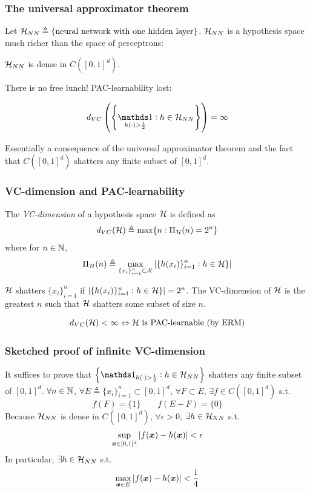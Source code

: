 \documentclass{beamer}
\DeclareMathOperator{\ind}{{\mathds 1}}
\begin{document}
\begin{frame}

\frametitle{The universal approximator theorem}

Let ${\mathcal H}_{NN} \triangleq \{\text{neural network with one hidden layer}\}$.
${\mathcal H}_{NN}$ is a hypothesis space much richer than the space of perceptrons:
\begin{theorem}
${\mathcal H}_{NN}$ is dense in $C ([0, 1]^d)$.
\end{theorem}

There is no free lunch!
PAC-learnability lost:
\begin{corollary}
\[
d_{VC} \left(\left\{\ind_{h(\cdot) > \frac12} : h \in \calh_{NN}\right\}\right) = \infty
\]
\end{corollary}
Essentially a consequence of the universal approximator theorem and the fact that $C ([0, 1]^d)$ shatters any finite subset of $[0, 1]^d$.

\end{frame}

\begin{frame}

\frametitle{VC-dimension and PAC-learnability}

\begin{definition}
The \emph{VC-dimension} of a hypothesis space ${\mathcal H}$ is defined as
\[
d_{VC} ({\mathcal H}) \triangleq \max \{n : \Pi_{\mathcal H} (n) = 2^n\}
\]
where for $n \in {\mathbb N}$,
\[
\Pi_{\mathcal H} (n) \triangleq \max_{\{x_i\}_{i = 1}^n \subset {\mathcal X}} |\{h(x_i)\}_{i = 1}^n : h \in {\mathcal H}\}|
\]
\end{definition}

${\mathcal H}$ shatters $\{x_i\}_{i = 1}^n$ if $|\{h(x_i)\}_{i = 1}^n : h \in {\mathcal H}\}| = 2^n$.
The VC-dimension of ${\mathcal H}$ is the greatest $n$ such that ${\mathcal H}$ shatters some subset of size $n$.

\begin{theorem}
\[
d_{VC} ({\mathcal H}) < \infty
\Leftrightarrow {\mathcal H}\ \text{is PAC-learnable (by ERM)}
\]
\end{theorem}

\end{frame}

\begin{frame}

\frametitle{Sketched proof of infinite VC-dimension}

It suffices to prove that $\left\{\ind_{h(\cdot) > \frac12} : h \in \calh_{NN}\right\}$ shatters any finite subset of $[0, 1]^d$.
$\forall n \in {\mathbb N}$, $\forall E \triangleq \{x_i\}_{i = 1}^n \subset [0, 1]^d$, $\forall F \subset E$, $\exists f \in C([0, 1]^d)$ s.t.
\[
f(F) = \{1\} \qquad f(E - F) = \{0\}
\]
Because ${\mathcal H}_{NN}$ is dense in $C([0, 1]^d)$, $\forall \epsilon > 0$, $\exists h \in {\mathcal H}_{NN}$ s.t.
\[
\sup_{{\bm x} \in [0, 1]^d} |f({\bm x}) - h({\bm x})| < \epsilon
\]
In particular, $\exists h \in {\mathcal H}_{NN}$ s.t.
\[
\max_{{\bm x} \in E} |f({\bm x}) - h({\bm x})| < \frac14
\]

\end{frame}
\end{document}
